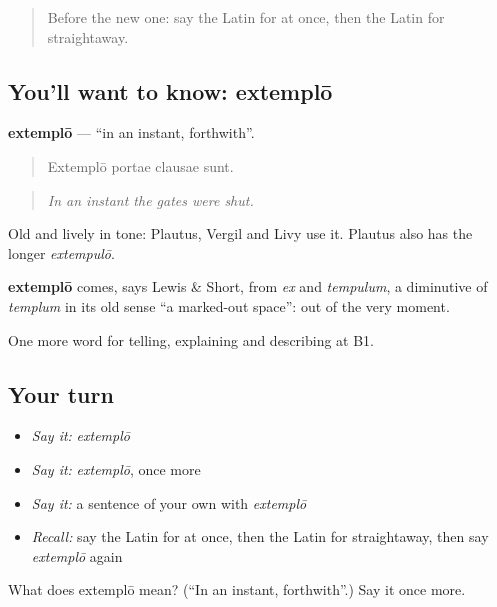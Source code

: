 \begin{quote}
Before the new one: say the Latin for at once, then the Latin for straightaway.
\end{quote}

\subsection*{You'll want to know: extemplō}
\textbf{extemplō} — \textquotedblleft{}in an instant, forthwith\textquotedblright{}.

\begin{quote}
Extemplō portae clausae sunt.
\end{quote}

\begin{quote}
\emph{In an instant the gates were shut.}
\end{quote}

Old and lively in tone: Plautus, Vergil and Livy use it. Plautus also has the longer \emph{extempulō}.

\begin{cousinweb}
\textbf{extemplō} comes, says Lewis \& Short, from \emph{ex} and \emph{tempulum}, a diminutive of \emph{templum} in its old sense \textquotedblleft{}a marked-out space\textquotedblright{}: out of the very moment.
\end{cousinweb}

\begin{grammarlens}[title={What you've built}]
One more word for telling, explaining and describing at B1.
\end{grammarlens}

\subsection*{Your turn}
\begin{itemize}
\raggedright
  \item \emph{Say it:} \emph{extemplō}
  \item \emph{Say it:} \emph{extemplō}, once more
  \item \emph{Say it:} a sentence of your own with \emph{extemplō}
  \item \emph{Recall:} say the Latin for at once, then the Latin for straightaway, then say \emph{extemplō} again
\end{itemize}

\begin{tcolorbox}[breakable,colback=teal!4,colframe=teal!35!black,title={Before you move on}]
What does extemplō mean? (\textquotedblleft{}In an instant, forthwith\textquotedblright{}.) Say it once more.
\end{tcolorbox}
